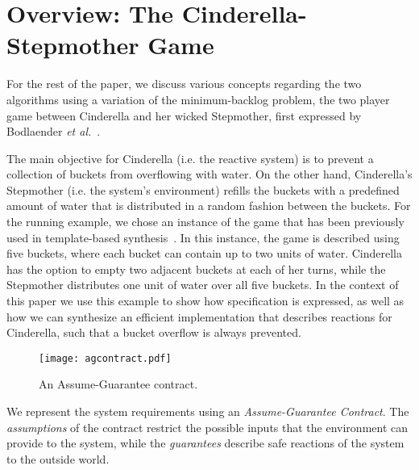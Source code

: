 \section{Overview: The Cinderella-Stepmother Game}
\label{sec:example}

For the rest of the paper, we discuss various concepts regarding the two algorithms using a variation of the minimum-backlog
problem, the two player game between Cinderella and her wicked Stepmother, first expressed by Bodlaender \textit{et al.}~\cite{bodlaender2012cinderella}.

The main objective for Cinderella (i.e. the reactive system) is to prevent a
collection of buckets from overflowing with water. On the other hand,
Cinderella's Stepmother (i.e. the system's environment) refills the buckets with a predefined amount of water that is distributed in a random fashion between the buckets.
For the running example, we chose an instance of the game that has been
previously used in template-based synthesis~\cite{beyene2014constraint}. In this instance, the game is described
using five buckets, where each bucket can contain up to two units of water.
Cinderella has the option to empty two adjacent buckets at each of her turns,
while the Stepmother distributes one unit of water over all five buckets. In the context of this paper we use this example to show how specification is expressed, as well as how we can synthesize an efficient implementation that describes reactions for Cinderella, such that a bucket overflow is always prevented.

\begin{figure}[!t]
\centering
\texttt{[image: agcontract.pdf]}
\caption{An Assume-Guarantee contract.}
\label{fg:agcontract}
\end{figure}

We represent the system requirements using an \textit{Assume-Guarantee
Contract}. The \emph{assumptions} of the contract restrict the possible inputs that the
environment can provide to the system, while the \emph{guarantees}
describe safe reactions of the system to the outside world.

